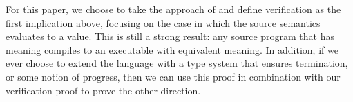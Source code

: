For this paper, we choose to take the approach of \cite{chlipala2007certified}
and define verification as the first implication above, focusing on the case in
which the source semantics evaluates to a value. This is still a strong
result: any source program that has meaning compiles to an executable with
equivalent meaning. In addition, if we ever choose to extend the language with a
type system that ensures termination, or some notion of progress, then we can
use this proof in combination with our verification proof to prove the other
direction. 
